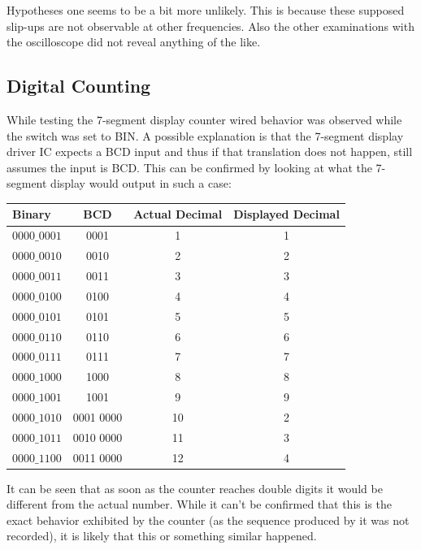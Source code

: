 \documentclass[fleqn,14pt]{article}
\begin{document}
Hypotheses one seems to be a bit more unlikely. This is because these supposed slip-ups are not observable
at other frequencies. Also the other examinations with the oscilloscope did not reveal anything of the like.

\subsection{Digital Counting}
While testing the 7-segment display counter wired behavior was observed while the switch was set to BIN.
A possible explanation is that the 7-segment display driver IC expects a BCD input and thus if that translation
does not happen, still assumes the input is BCD. This can be confirmed by looking at what the 7-segment display
would output in such a case:

\vspace{0.5cm}
\begin{tabular}{lccc}
  Binary & BCD & Actual Decimal & Displayed Decimal\\
  \midrule
  $0000\_0001$ & 0001 & 1 & 1\\
  $0000\_0010$ & 0010 & 2 & 2\\
  $0000\_0011$ & 0011 & 3 & 3\\
  $0000\_0100$ & 0100 & 4 & 4\\
  $0000\_0101$ & 0101 & 5 & 5\\
  $0000\_0110$ & 0110 & 6 & 6\\
  $0000\_0111$ & 0111 & 7 & 7\\
  $0000\_1000$ & 1000 & 8 & 8\\
  $0000\_1001$ & 1001 & 9 & 9\\
  $0000\_1010$ & 0001 0000 & 10 & 2\\
  $0000\_1011$ & 0010 0000 & 11 & 3\\
  $0000\_1100$ & 0011 0000 & 12 & 4\\
\end{tabular}
\vspace{0.5cm}

It can be seen that as soon as the counter reaches double digits it would be different from the actual
number. While it can't be confirmed that this is the exact behavior exhibited by the counter (as the
sequence produced by it was not recorded), it is likely that this or something similar happened.\\
\end{document}
